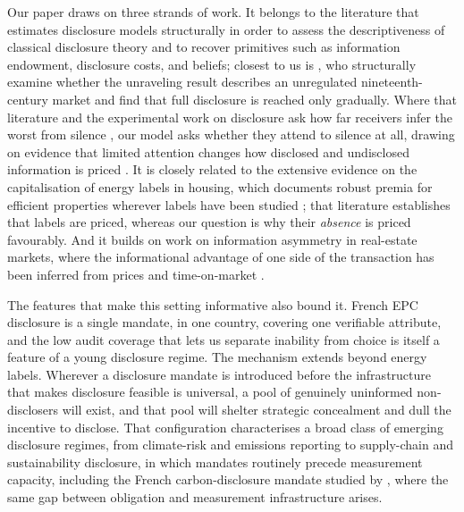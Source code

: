 Our paper draws on three strands of work. It belongs to the literature that estimates
disclosure models structurally in order to assess the descriptiveness of classical disclosure
theory and to recover primitives such as information endowment, disclosure costs, and beliefs;
closest to us is \citet{bourveau_learning_2025}, who structurally examine whether the unraveling
result describes an unregulated nineteenth-century market and find that full disclosure is
reached only gradually. Where that literature and the experimental work on disclosure ask how far
receivers infer the worst from silence \citep{jin_is_2021, hagenbach_motivated_2025}, our model
asks whether they attend to silence at all, drawing on evidence that limited attention changes how
disclosed and undisclosed information is priced \citep{hirshleifer_limited_2003, dellavigna_investor_2009}.
It is closely related to the extensive evidence on the capitalisation of energy labels in
housing, which documents robust premia for efficient properties wherever labels have been
studied \citep{brounen_kok_2011, hyland_lyons_2013, fuerst_energy_2016, frondel_power_2018,
myers_mandatory_2022}; that literature establishes that labels are priced, whereas our question
is why their \emph{absence} is priced favourably. And it builds on work on information
asymmetry in real-estate markets, where the informational advantage of one side of the
transaction has been inferred from prices and time-on-market \citep{levitt_syverson_2008,
lizzeri_1999}.

The features that make this setting informative also bound it. French EPC disclosure is a
single mandate, in one country, covering one verifiable attribute, and the low audit coverage
that lets us separate inability from choice is itself a feature of a young disclosure regime.
The mechanism extends beyond energy labels. Wherever a disclosure mandate is
introduced before the infrastructure that makes disclosure feasible is universal, a pool of
genuinely uninformed non-disclosers will exist, and that pool will shelter strategic
concealment and dull the incentive to disclose. That configuration characterises a broad class
of emerging disclosure regimes, from climate-risk and emissions reporting to supply-chain and
sustainability disclosure, in which mandates routinely precede measurement capacity, including
the French carbon-disclosure mandate studied by \citet{bourveau_carbon_2024}, where the same
gap between obligation and measurement infrastructure arises.
